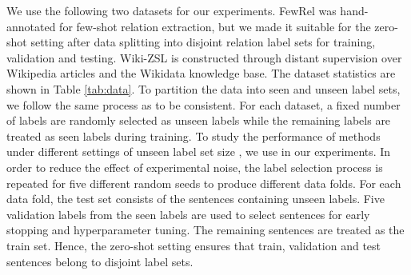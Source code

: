 \documentclass[11pt]{article}
\begin{document}
We use the following two datasets for our experiments.
FewRel \cite{han2018fewrel} was hand-annotated for few-shot relation extraction, but we made it suitable for the zero-shot setting after data splitting into disjoint relation label sets for training, validation and testing.
Wiki-ZSL \cite{chen2021zs} is constructed through distant supervision over Wikipedia articles and the Wikidata knowledge base.
The dataset statistics are shown in Table \ref{tab:data}.
To partition the data into seen and unseen label sets, we follow the same process as \citet{chen2021zs} to be consistent.
For each dataset, a fixed number of labels are randomly selected as unseen labels while the remaining labels are treated as seen labels during training.
To study the performance of methods under different settings of unseen label set size , we use  in our experiments.
In order to reduce the effect of experimental noise, the label selection process is repeated for five different random seeds to produce different data folds.
For each data fold, the test set consists of the sentences containing unseen labels.
Five validation labels from the seen labels are used to select sentences for early stopping and hyperparameter tuning. 
The remaining sentences are treated as the train set.
Hence, the zero-shot setting ensures that train, validation and test sentences belong to disjoint label sets.

\begin{table}[!t]
    \centering
    \caption{Dataset statistics. ``Sentence Length'' refers to the average number of words in each sentence.} 
    \label{tab:data}
\end{table} 
\end{document}
